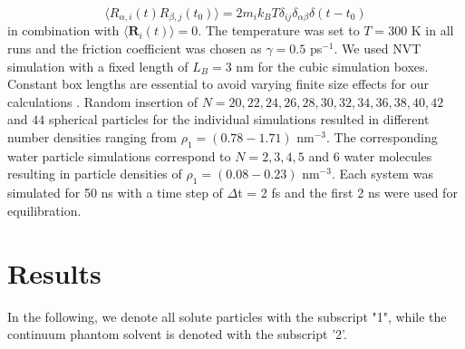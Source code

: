 \documentclass[aip,jcp,reprint]{revtex4-1}
\begin{document}
\begin{equation}
\langle R_{\alpha,i}(t)R_{\beta,j}(t_0)\rangle = 2 m_i k_BT \delta_{ij}\delta_{\alpha\beta}\delta(t-t_0)
\end{equation}
in combination with  $\langle {\textbf{R}}_i(t)\rangle = 0 $. The temperature was set to $T=300$ K in all runs and the friction coefficient was chosen as $\gamma = 0.5$ ps$^{-1}$. 
We used NVT simulation with a fixed length of $L_B = 3$ nm for the cubic simulation boxes. Constant box lengths are essential to avoid varying finite size effects for our calculations \cite{yeh04a}. Random insertion of $N=20, 22, 24, 26, 28, 30, 32,34,36, 38, 40, 42$ and $44$ spherical particles for the individual  simulations resulted in different number densities ranging from $\rho_1 =  (0.78 - 1.71)$ nm$^{-3}$. The corresponding water particle simulations correspond to $N = 2,3,4,5$ and 6 water molecules resulting in particle densities of $\rho_1 = (0.08 - 0.23)$ nm$^{-3}$. Each system was simulated for 50 ns with a time step of $\Delta$t = 2 fs and the first 2 ns were used for equilibration. 


\section{Results}
In the following, we denote all solute particles with the subscript "1", while the continuum phantom solvent is denoted with the subscript '2'.
\end{document}
